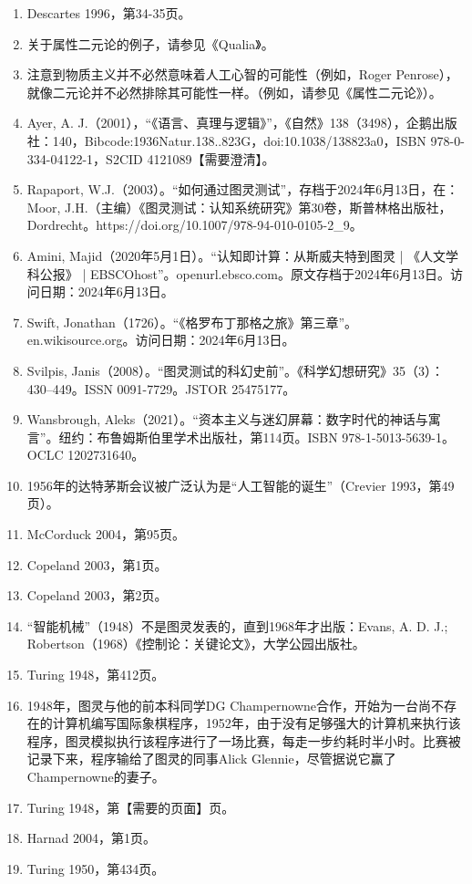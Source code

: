 \begin{enumerate}
\item Descartes 1996，第34-35页。
\item 关于属性二元论的例子，请参见《Qualia》。
\item 注意到物质主义并不必然意味着人工心智的可能性（例如，Roger Penrose），就像二元论并不必然排除其可能性一样。（例如，请参见《属性二元论》）。
\item Ayer, A. J.（2001），“《语言、真理与逻辑》”，《自然》138（3498），企鹅出版社：140，Bibcode:1936Natur.138..823G，doi:10.1038/138823a0，ISBN 978-0-334-04122-1，S2CID 4121089【需要澄清】。
\item Rapaport, W.J.（2003）。“如何通过图灵测试”，存档于2024年6月13日，在：Moor, J.H.（主编）《图灵测试：认知系统研究》第30卷，斯普林格出版社，Dordrecht。https://doi.org/10.1007/978-94-010-0105-2_9。
\item Amini, Majid（2020年5月1日）。“认知即计算：从斯威夫特到图灵 | 《人文学科公报》 | EBSCOhost”。openurl.ebsco.com。原文存档于2024年6月13日。访问日期：2024年6月13日。
\item Swift, Jonathan（1726）。“《格罗布丁那格之旅》第三章”。en.wikisource.org。访问日期：2024年6月13日。
\item Svilpis, Janis（2008）。“图灵测试的科幻史前”。《科学幻想研究》35（3）：430–449。ISSN 0091-7729。JSTOR 25475177。
\item Wansbrough, Aleks（2021）。“资本主义与迷幻屏幕：数字时代的神话与寓言”。纽约：布鲁姆斯伯里学术出版社，第114页。ISBN 978-1-5013-5639-1。OCLC 1202731640。
\item 1956年的达特茅斯会议被广泛认为是“人工智能的诞生”（Crevier 1993，第49页）。
\item McCorduck 2004，第95页。
\item Copeland 2003，第1页。
\item Copeland 2003，第2页。
\item “智能机械”（1948）不是图灵发表的，直到1968年才出版：Evans, A. D. J.; Robertson（1968）《控制论：关键论文》，大学公园出版社。
\item Turing 1948，第412页。
\item 1948年，图灵与他的前本科同学DG Champernowne合作，开始为一台尚不存在的计算机编写国际象棋程序，1952年，由于没有足够强大的计算机来执行该程序，图灵模拟执行该程序进行了一场比赛，每走一步约耗时半小时。比赛被记录下来，程序输给了图灵的同事Alick Glennie，尽管据说它赢了Champernowne的妻子。
\item Turing 1948，第【需要的页面】页。
\item Harnad 2004，第1页。
\item Turing 1950，第434页。

\end{enumerate}
